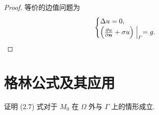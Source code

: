 \begin{proof}
  等价的边值问题为
  \[\begin{cases}
    \Delta u = 0, \\
    \Bigl(\frac{\partial u}{\partial \bm{n}} + \sigma u\Bigr)\Bigm|_{\varGamma} = g.
  \end{cases}\]
\end{proof}



\section{格林公式及其应用}

\begin{exercise}
  证明 (2.7) 式对于 $M_0$ 在 $\varOmega$ 外与 $\Gamma$ 上的情形成立.
\end{exercise}

